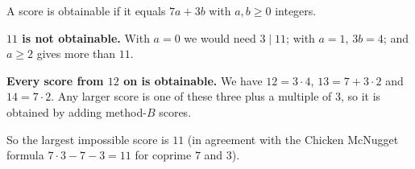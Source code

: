 A score is obtainable if it equals $7a+3b$ with $a,b\ge0$ integers.

\textbf{$11$ is not obtainable.} With $a=0$ we would need $3\mid11$; with $a=1$, $3b=4$; and $a\ge2$ gives more than $11$.

\textbf{Every score from $12$ on is obtainable.} We have $12=3\cdot4$, $13=7+3\cdot2$ and $14=7\cdot2$. Any larger score is one of these three plus a multiple of $3$, so it is obtained by adding method-$B$ scores.

So the largest impossible score is $\boxed{11}$ (in agreement with the Chicken McNugget formula $7\cdot3-7-3=11$ for coprime $7$ and $3$).
